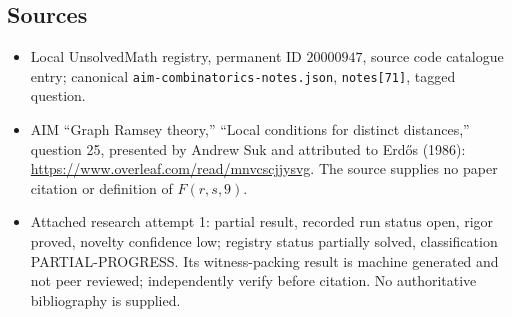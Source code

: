 \documentclass[11pt]{article}
\begin{document}
\subsection{Sources}
\begin{itemize}
\item Local UnsolvedMath registry, permanent ID $20000947$, source code catalogue entry; canonical \texttt{aim-combinatorics-notes.json}, \texttt{notes[71]}, tagged question.
\item AIM ``Graph Ramsey theory,'' ``Local conditions for distinct distances,'' question 25, presented by Andrew Suk and attributed to Erd\H{o}s (1986): \url{https://www.overleaf.com/read/mnvcscjjysvg}. The source supplies no paper citation or definition of $F(r,s,9)$.
\item Attached research attempt 1: partial result, recorded run status open, rigor proved, novelty confidence low; registry status partially solved, classification PARTIAL-PROGRESS. Its witness-packing result is machine generated and not peer reviewed; independently verify before citation. No authoritative bibliography is supplied.
\end{itemize}
\end{document}
